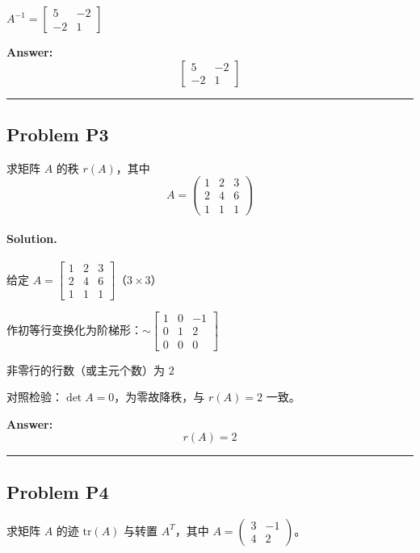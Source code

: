 \documentclass[12pt, a4paper]{article}
\newcommand{\problem}[1]{\subsection*{Problem #1}}
\newcommand{\solution}{\paragraph{Solution.}}
\begin{document}
$A^{-1} = \left[\begin{matrix}5 & -2\\-2 & 1\end{matrix}\right]$

\textbf{Answer:}
\[\left[\begin{matrix}5 & -2\\-2 & 1\end{matrix}\right]\]


\vspace{1em}
\hrule
\vspace{1em}

\problem{P3}

求矩阵 $A$ 的秩 $r(A)$，其中
   $$A = \begin{pmatrix} 1 & 2 & 3 \\ 2 & 4 & 6 \\ 1 & 1 & 1 \end{pmatrix}$$

\solution


给定 $A = \left[\begin{matrix}1 & 2 & 3\\2 & 4 & 6\\1 & 1 & 1\end{matrix}\right]$（$3\times3$）

作初等行变换化为阶梯形：$\sim \left[\begin{matrix}1 & 0 & -1\\0 & 1 & 2\\0 & 0 & 0\end{matrix}\right]$

非零行的行数（或主元个数）为 $2$

对照检验：$\det A = 0$，$为零故降秩$，与 $r(A)=2$ 一致。

\textbf{Answer:}
\[r(A) = 2\]


\vspace{1em}
\hrule
\vspace{1em}

\problem{P4}

求矩阵 $A$ 的迹 $\mathrm{tr}(A)$ 与转置 $A^T$，其中 $A = \begin{pmatrix} 3 & -1 \\ 4 & 2 \end{pmatrix}$。
\end{document}
